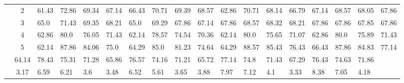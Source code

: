 \begin{table}[h]
{\begin{tabular}{cc|llll|llll|llll|llll}
 & 2 & 61.43 & 72.86 & 69.34 & 67.14 & 66.43 & 70.71 & 69.39 & 68.57 & 62.86 & 70.71 & 68.14 & 66.79 & 67.14 & 68.57 & 68.05 & 67.86 \\
 & 3 & 65.0 & 71.43 & 69.35 & 68.21 & 65.0 & 69.29 & 67.86 & 67.14 & 67.86 & 68.57 & 68.32 & 68.21 & 67.86 & 67.86 & 67.85 & 67.86 \\
 & 4 & 62.86 & 80.0 & 76.05 & 71.43 & 62.14 & 78.57 & 74.54 & 70.36 & 62.14 & 80.0 & 75.65 & 71.07 & 62.86 & 80.0 & 75.89 & 71.43 \\
 & 5 & 62.14 & 87.86 & 84.06 & 75.0 & 64.29 & 85.0 & 81.23 & 74.64 & 64.29 & 88.57 & 85.43 & 76.43 & 66.43 & 87.86 & 84.83 & 77.14 \\
\rowcolor{lightgray!50}\multicolumn{2}{r|}{avg} & 64.14 & 78.43 & 75.31 & 71.28 & 65.86 & 76.57 & 74.16 & 71.21 & 65.72 & 77.14 & 74.8 & 71.43 & 67.29 & 76.43 & 74.63 & 71.86 \\
\rowcolor{lightgray!50}\multicolumn{2}{r|}{std} & 3.17 & 6.59 & 6.21 & 3.6 & 3.48 & 6.52 & 5.61 & 3.65 & 3.88 & 7.97 & 7.12 & 4.1 & 3.33 & 8.38 & 7.05 & 4.18
\end{tabular}}
\end{table}


